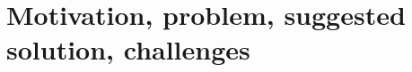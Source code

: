 

\makeatletter
\renewcommand{\@title}{On-Chain Parametric Cost Insurance for Underserved
Latin-American Digital Workers \\[0.3em]
\large Record of Closed Iterations and Request for Methodological Guidance}
\renewcommand{\@author}{d\textsuperscript{2}~finance \\ \href{https://github.com/wvs-finance}{\texttt{github.com/wvs-finance}}}
\renewcommand{\@date}{2026-05-06}
\makeatother


\maketitle
\thispagestyle{empty}

\section{Motivation, problem, suggested solution, challenges}\label{sec:1}

